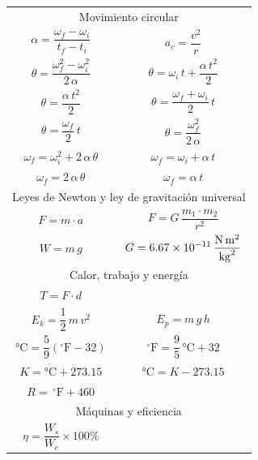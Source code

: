 \documentclass[12pt, letter]{exam}
\begin{document}
\begin{table}[H]
    \centering
    \setlength{\tabcolsep}{40pt}
    \renewcommand{\arraystretch}{2.5}
    \begin{tabular}{c  c}
        \multicolumn{2}{c}{Movimiento circular} \\
            $\alpha = \dfrac{\omega_{f} - \omega_{i}}{t_{f} - t_{i}}$ & $a_{c} = \dfrac{v^{2}}{r}$ \\
            $\theta = \dfrac{\omega_{f}^{2} - \omega_{i}^{2}}{2 \, \alpha}$ & $\theta = \omega_{i} \, t + \dfrac{\alpha \, t^{2}}{2}$ \\
            $\theta = \dfrac{\alpha \, t^{2}}{2}$ & $\theta = \dfrac{\omega_{f} + \omega_{i}}{2} \, t$ \\
            $\theta = \dfrac{\omega_{f}}{2} \, t$ & $\theta = \dfrac{\omega_{f}^{2}}{2 \, \alpha}$ \\
            $\omega_{f} = \omega_{i}^{2} + 2 \, \alpha \, \theta$ & $\omega_{f} = \omega_{i} + \alpha \, t$ \\
            $\omega_{f} = 2 \, \alpha \, \theta$ & $\omega_{f} = \alpha \, t$ \\ \hline
        \multicolumn{2}{c}{Leyes de Newton y ley de gravitación universal} \\
            $F = m \cdot a$ & $F = G \, \dfrac{m_{1} \cdot m_{2}}{r^{2}}$ \\
            $W = m \, g$ & $G = \displaystyle \SI[per-mode=fraction]{6.67d-11}{\newton\square\meter\per\square\kilo\gram}$ \\ \hline
        \multicolumn{2}{c}{Calor, trabajo y energía} \\
            $T = F \cdot d$ &  \\
            $E_{k} = \dfrac{1}{2} \, m \, v^{2}$ & $E_{p} = m \, g \, h$ \\
            $\unit{\degreeCelsius} = \dfrac{5}{9} \left( ^{\circ}\text{F} - 32 \right)$ & $^{\circ}\text{F} = \dfrac{9}{5} \, \unit{\degreeCelsius} + 32$ \\
            $K = \unit{\degreeCelsius} + 273.15$ & $\unit{\degreeCelsius} = K - 273.15$ \\
            $R = \, ^{\circ}\text{F} + 460$ &  \\ \hline
        \multicolumn{2}{c}{Máquinas y eficiencia} \\
            $\eta = \dfrac{W_{s}}{W_{e}} \times 100 \%$ & \\
\end{tabular}
\end{table}
\end{document}
